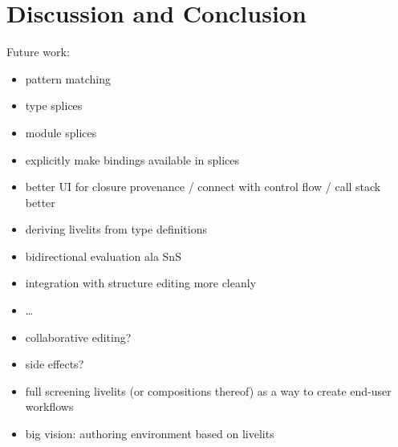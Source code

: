 \section{Discussion and Conclusion}\label{sec:discussion}\label{sec:conclusion}
Future work:
\begin{itemize}
  \item pattern matching
  \item type splices
  \item module splices
  \item explicitly make bindings available in splices
  \item better UI for closure provenance / connect with control flow / call stack better
  \item deriving livelits from type definitions
  \item bidirectional evaluation ala SnS
  \item integration with structure editing more cleanly
  \item \dots
  \item collaborative editing?
  \item side effects?
  \item full screening livelits (or compositions thereof) as a way to create end-user workflows
  \item big vision: authoring environment based on livelits
\end{itemize}

